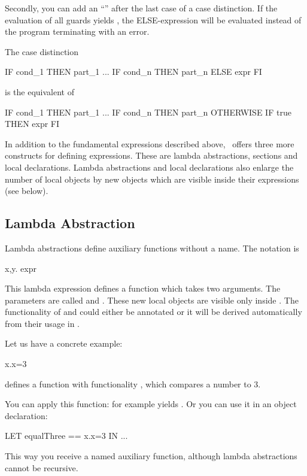 Secondly, you can add an ``'' after the last case of a
case distinction. 
If the evaluation of all guards yields , the ELSE-expression
will be evaluated instead of the program terminating with an error.

\smallskip
\noindent The case distinction
\begin{prog}
        IF cond_1 THEN part_1
        ...
        IF cond_n THEN part_n 
        ELSE expr
        FI
\end{prog}
is the equivalent of 
\begin{prog}
        IF cond_1 THEN part_1
        ...
        IF cond_n THEN part_n 
        OTHERWISE
        IF true THEN expr
        FI
\end{prog}
\bigskip

\advanced In addition to the fundamental expressions  described above,
\opal\ offers three more constructs for defining expressions.
These are  lambda abstractions, sections and local declarations.
Lambda abstractions and local declarations also enlarge the number of
local objects by new objects  
which are visible inside their expressions (see below). 

\subsection{Lambda Abstraction}
\label{subsec:lambda}
\advanced
Lambda abstractions define auxiliary functions without a name.
The notation is
\begin{prog}
        \LAMBDA{}x,y. expr 
\end{prog}

This lambda expression defines a function which takes two arguments.
The parameters are called  and .
These new local objects are visible only inside .
The functionality of  and  could either be annotated or it
will be derived automatically from their usage in .

\smallskip\noindent Let us have a concrete example: 
\begin{prog}
        \LAMBDA{}x.x=3
\end{prog}
defines a function with functionality , which compares
a number to 3.

You can apply this function: for example  yields
.
Or you can use it in an object declaration:
\begin{prog}
        LET equalThree == \LAMBDA{}x.x=3
        IN ...
\end{prog}
This way you receive a named auxiliary function, although
lambda abstractions cannot be recursive.

